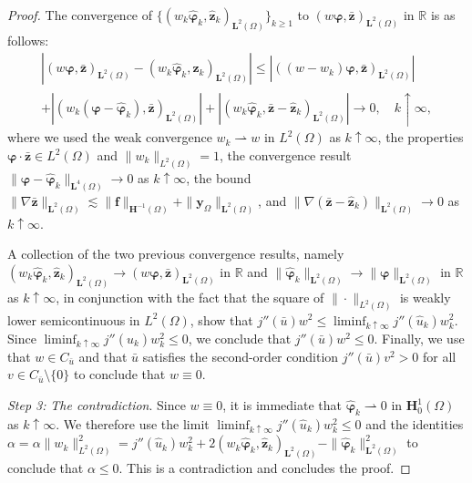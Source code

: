 \documentclass[final]{siamart0216}
\begin{document}
\begin{proof}
The convergence of $\{ (w_k\hat{\boldsymbol{\varphi}}_k,\hat{\mathbf{z}}_k)_{\mathbf{L}^2(\Omega)} \}_{k \geq 1}$ to $(w\boldsymbol{\varphi},\bar{\mathbf{z}})_{\mathbf{L}^2(\Omega)}$ in $\mathbb{R}$ is as follows:
\begin{multline*}
\left| (w\boldsymbol{\varphi},\bar{\mathbf{z}})_{\mathbf{L}^2(\Omega)}-(w_k\hat{\boldsymbol{\varphi}}_k,\hat{\mathbf{z}}_k)_{\mathbf{L}^2(\Omega)} \right|
\leq |((w-w_k)\boldsymbol{\varphi},\bar{\mathbf{z}})_{\mathbf{L}^2(\Omega)}|
\\
+\left| (w_k(\boldsymbol{\varphi}-\hat{\boldsymbol{\varphi}}_k),\bar{\mathbf{z}})_{\mathbf{L}^2(\Omega)} \right|
+
\left| (w_k\hat{\boldsymbol{\varphi}}_k,\bar{\mathbf{z}}-\hat{\mathbf{z}}_k)_{\mathbf{L}^2(\Omega)} \right|
\to 0,
\quad k\uparrow\infty,
\end{multline*}
where we used the weak convergence $w_k \rightharpoonup w$ in $L^2(\Omega)$ as $k\uparrow\infty$, the properties $\boldsymbol{\varphi}\cdot \bar{\mathbf{z}}\in L^2(\Omega)$ and $\|w_k\|_{L^2(\Omega)}=1$, the convergence result $\|\boldsymbol{\varphi}-\hat{\boldsymbol{\varphi}}_k \|_{\mathbf{L}^4(\Omega)}\to 0$ as $k\uparrow\infty$, the bound $\|\nabla \bar{\mathbf{z}}\|_{\mathbf{L}^2(\Omega)}\lesssim \|\mathbf{f}\|_{\mathbf{H}^{-1}(\Omega)}+\|\mathbf{y}_{\Omega}\|_{\mathbf{L}^2(\Omega)}$, and $\|\nabla(\bar{\mathbf{z}}-\hat{\mathbf{z}}_k)\|_{\mathbf{L}^{2}(\Omega)}\to 0$ as $k\uparrow\infty$.

A collection of the two previous convergence results, namely $(w_k\hat{\boldsymbol{\varphi}}_k,\hat{\mathbf{z}}_k)_{\mathbf{L}^2(\Omega)} \to (w\boldsymbol{\varphi},\bar{\mathbf{z}})_{\mathbf{L}^2(\Omega)}$ in $\mathbb{R}$ and $\|\hat{\boldsymbol{\varphi}}_k\|_{\mathbf{L}^2(\Omega)} \to \|\boldsymbol{\varphi}\|_{\mathbf{L}^2(\Omega)}$ in $\mathbb{R}$ as $k\uparrow\infty$, in conjunction with the fact that the square of $\| \cdot \|_{L^2(\Omega)}$ is weakly lower semicontinuous in $L^2(\Omega)$, show that $j''(\bar{u})w^2 \leq \liminf_{k\uparrow \infty} j''(\hat{u}_k)w_k^2$. Since $\liminf_{k\uparrow \infty} j''(\hat{u}_k)w_k^2 \leq 0$, we conclude that $j''(\bar{u})w^2 \leq 0$. Finally, we use that $w \in C_{\bar u}$ and that $\bar u$ satisfies the second-order condition $j''(\bar u) v^2 > 0$ for all $v \in C_{\bar u} \setminus \{ 0 \}$ to conclude that $w \equiv 0$.

\emph{Step 3:} \emph{The contradiction}. Since $w \equiv 0$, it is immediate that $\hat{\boldsymbol{\varphi}}_k \rightharpoonup 0$ in $\mathbf{H}_0^1(\Omega)$ as $k\uparrow\infty$. We therefore use the limit $\liminf_{k\uparrow \infty} j''(\hat{u}_k)w_k^2 \leq 0$ and the identities $\alpha = \alpha \|w_k\|_{L^2(\Omega)}^2 = j''(\hat{u}_k)w_k^2 + 2(w_k\hat{\boldsymbol{\varphi}}_k,\hat{\mathbf{z}}_k)_{\mathbf{L}^2(\Omega)}-\|\hat{\boldsymbol{\varphi}}_k\|_{\mathbf{L}^{2}(\Omega)}^2$ to conclude that $\alpha\leq 0$. This is a contradiction and concludes the proof.
\end{proof}
\end{document}
